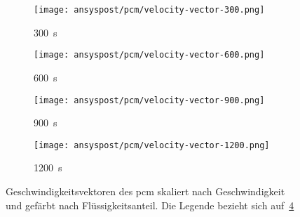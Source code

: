 \begin{figure}[H]
    \centering

    \begin{subfigure}[t]{0.14\textwidth}
        \centering
    \end{subfigure}%
    \hspace{2mm}%
    \begin{subfigure}[t]{0.2\textwidth}
        \centering
        \texttt{[image: ansyspost/pcm/velocity-vector-300.png]}
        \caption{\SI{300}{\second}}\label{fig:velocity_vector_300}
    \end{subfigure}%
    \begin{subfigure}[t]{0.2\textwidth}
        \centering
        \texttt{[image: ansyspost/pcm/velocity-vector-600.png]}
        \caption{\SI{600}{\second}}\label{fig:velocity_vector_600}
    \end{subfigure}%
    \begin{subfigure}[t]{0.2\textwidth}
        \centering
        \texttt{[image: ansyspost/pcm/velocity-vector-900.png]}
        \caption{\SI{900}{\second}}\label{fig:velocity_vector_900}
    \end{subfigure}%
    \begin{subfigure}[t]{0.2\textwidth}
        \centering
        \texttt{[image: ansyspost/pcm/velocity-vector-1200.png]}
        \caption{\SI{1200}{\second}}\label{fig:velocity_vector_1200}
    \end{subfigure}
    \caption{Geschwindigkeitsvektoren des \ac{pcm} skaliert nach Geschwindigkeit und gefärbt nach Flüssigkeitsanteil. Die Legende bezieht sich auf~\ref{fig:velocity_vector_1200}}\label{fig:pcm_velocity_vektoren_kontur}
\end{figure}